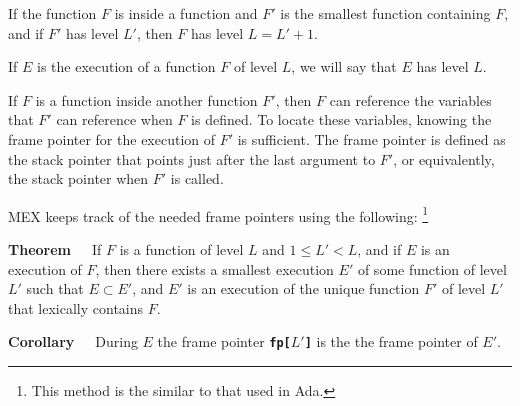 \documentclass[12pt]{article}
\newcommand{\TT}[1]{{\tt \bfseries #1}}
\newenvironment{indpar}[1][0.3in]%
	{\begin{list}{}%
		     {\setlength{\itemsep}{0in}%
		      \setlength{\topsep}{0in}%
		      \setlength{\parsep}{1ex}%
		      \setlength{\labelwidth}{#1}%
		      \setlength{\leftmargin}{#1}%
		      \addtolength{\leftmargin}{\labelsep}}%
	 \item}%
	{\end{list}}
\begin{document}
If the function $F$ is inside a function and $F'$ is the smallest
function containing $F$, and if $F'$ has level $L'$, then $F$
has level $L=L'+1$.

If $E$ is the execution of a function $F$ of level $L$, we will
say that $E$ has level $L$.

If $F$ is a function inside another function $F'$, then $F$ can
reference the variables that $F'$ can reference when $F$ is
defined.  To locate these variables, knowing the frame pointer for the
execution of $F'$ is sufficient.  The frame pointer is defined as the
stack pointer that points just after the last argument to $F'$,
or equivalently, the stack
pointer when $F'$ is called.

MEX keeps track of the needed frame pointers using the following:%
\footnote{This method is the similar to that used in Ada.}
\begin{indpar}
{\bf Theorem}~~~If $F$ is a function of level $L$ and $1\le L'<L$,
and if $E$ is an execution of $F$, then there exists a smallest
execution $E'$ of some function of level $L'$ such that $E\subset E'$,
and $E'$ is an execution
of the unique function $F'$ of level $L'$ that lexically contains $F$.

{\bf Corollary}~~~During $E$ the frame pointer \TT{fp[$L'$]} is the
the frame pointer of $E'$.
\end{indpar}
\end{document}
